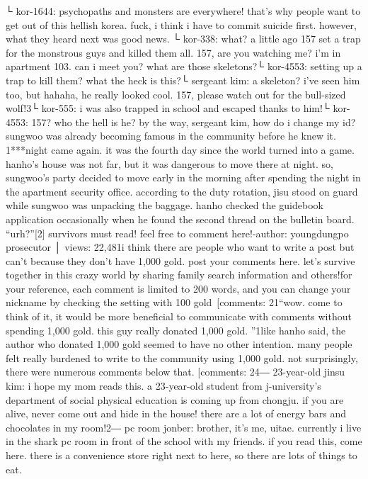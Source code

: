 └ kor-1644: psychopaths and monsters are everywhere! that’s why people want to get out of this hellish korea.
 fuck, i think i have to commit suicide first.
however, what they heard next was good news.
└ kor-338: what? a little ago 157 set a trap for the monstrous guys and killed them all.
 157, are you watching me? i’m in apartment 103.
 can i meet you? what are those skeletons?└ kor-4553: setting up a trap to kill them? what the heck is this?└ sergeant kim: a skeleton? i’ve seen him too, but hahaha, he really looked cool.
 157, please watch out for the bull-sized wolf!3└ kor-555: i was also trapped in school and escaped thanks to him!└ kor-4553: 157? who the hell is he? by the way, sergeant kim, how do i change my id?sungwoo was already becoming famous in the community before he knew it.
1***night came again.
 it was the fourth day since the world turned into a game.
hanho’s house was not far, but it was dangerous to move there at night.
so, sungwoo’s party decided to move early in the morning after spending the night in the apartment security office.
according to the duty rotation, jisu stood on guard while sungwoo was unpacking the baggage.
 hanho checked the guidebook application occasionally when he found the second thread on the bulletin board.
“urh?”[2] survivors must read! feel free to comment here!-author: youngdungpo prosecutor │ views: 22,481i think there are people who want to write a post but can’t because they don’t have 1,000 gold.
 post your comments here.
 let’s survive together in this crazy world by sharing family search information and others!for your reference, each comment is limited to 200 words, and you can change your nickname by checking the setting with 100 gold~[comments: 21“wow.
 come to think of it, it would be more beneficial to communicate with comments without spending 1,000 gold.
 this guy really donated 1,000 gold.
”1like hanho said, the author who donated 1,000 gold seemed to have no other intention.
many people felt really burdened to write to the community using 1,000 gold.
 not surprisingly, there were numerous comments below that.
[comments: 24― 23-year-old jinsu kim: i hope my mom reads this.
 a 23-year-old student from j-university’s department of social physical education is coming up from chongju.
 if you are alive, never come out and hide in the house! there are a lot of energy bars and chocolates in my room!2― pc room jonber: brother, it’s me, uitae.
 currently i live in the shark pc room in front of the school with my friends.
 if you read this, come here.
 there is a convenience store right next to here, so there are lots of things to eat.

